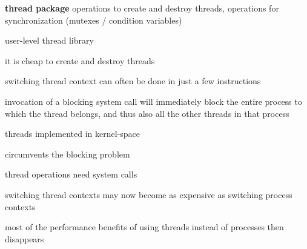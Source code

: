 \begin{compactitem}
	\item \textbf{thread package} operations to create and destroy threads, operations for synchronization (mutexes / condition variables)
	\item user-level thread library
	\begin{compactitem}
		\item it is cheap to create and destroy threads
		\item switching thread context can often be done in just a few instructions
		\item invocation of a blocking system call will immediately block the entire process to which the thread belongs, and thus also all the other threads in that process
	\end{compactitem}
	\item threads implemented in kernel-space	
	\begin{compactitem}
		\item circumvents the blocking problem
		\item thread operations need system calls
		\item switching thread contexts may now become as expensive as switching process contexts
		\item most of the performance benefits of using threads instead of processes then disappears
	\end{compactitem}
\end{compactitem}

